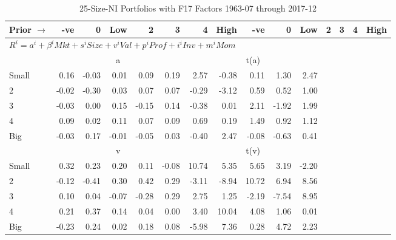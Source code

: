 
\begin{table}[!ht]
\footnotesize
\centering
\caption{25-Size-NI Portfolios with F17 Factors 1963-07 through 2017-12}
\begin{tabular}{lrrrrrrrrrrrrrr}
  \toprule
    Prior $\rightarrow$ & -ve & 0 & Low & 2 & 3 & 4 & High & -ve & 0 & Low & 2 & 3 & 4 & High \\ 
  \midrule
  \multicolumn{11}{l}{$R^i=a^i+\beta^iMkt+s^iSize+v^iVal+p^iProf+i^iInv+m^iMom$} \\

  
    
      & \multicolumn{5}{c}{a} & \multicolumn{5}{c}{t(a)}
    
    \\
      \cmidrule(r){2-6} \cmidrule(r){7-11}

    Small   & 0.16  & -0.03  & 0.01  & 0.09  & 0.19  & 2.57  & -0.38  & 0.11  & 1.30  & 2.47  \\
         2  & -0.02  & -0.30  & 0.03  & 0.07  & 0.07  & -0.29  & -3.12  & 0.59  & 0.52  & 1.00  \\
         3  & -0.03  & 0.00  & 0.15  & -0.15  & 0.14  & -0.38  & 0.01  & 2.11  & -1.92  & 1.99  \\
         4  & 0.09  & 0.02  & 0.11  & 0.07  & 0.09  & 0.69  & 0.19  & 1.49  & 0.92  & 1.12  \\
    Big     & -0.03  & 0.17  & -0.01  & -0.05  & 0.03  & -0.40  & 2.47  & -0.08  & -0.63  & 0.41  \\

  
    
      & \multicolumn{5}{c}{v} & \multicolumn{5}{c}{t(v)}
    
    \\
      \cmidrule(r){2-6} \cmidrule(r){7-11}

    Small   & 0.32  & 0.23  & 0.20  & 0.11  & -0.08  & 10.74  & 5.35  & 5.65  & 3.19  & -2.20  \\
         2  & -0.12  & -0.41  & 0.30  & 0.42  & 0.29  & -3.11  & -8.94  & 10.72  & 6.94  & 8.56  \\
         3  & 0.10  & 0.04  & -0.07  & -0.28  & 0.29  & 2.75  & 1.25  & -2.19  & -7.54  & 8.95  \\
         4  & 0.21  & 0.37  & 0.14  & 0.04  & 0.00  & 3.40  & 10.04  & 4.08  & 1.06  & 0.01  \\
    Big     & -0.23  & 0.24  & 0.02  & 0.18  & 0.08  & -5.98  & 7.36  & 0.28  & 4.72  & 2.23  \\

  
    

\end{tabular}
\end{table}

